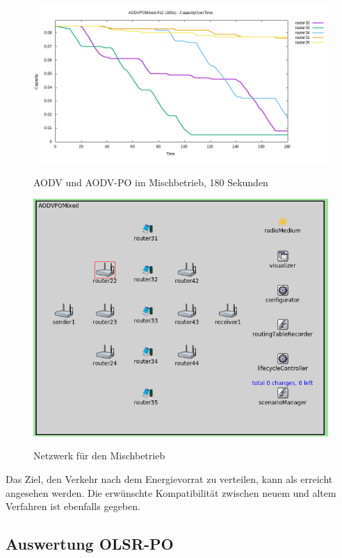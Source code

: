 \begin{figure}
  \centering
  \includegraphics[scale=0.55]{bilder/av11.png} \\
  \caption{AODV und AODV-PO im Mischbetrieb, 180 Sekunden}
  \label{image:omnet:olsr:av11}
\end{figure}

\begin{figure}
  \centering
  \includegraphics[scale=0.4]{bilder/netmixed.png} \\
  \caption{Netzwerk für den Mischbetrieb}
  \label{image:omnet:olsr:netmixed}
\end{figure}

Das Ziel, den Verkehr nach dem Energievorrat zu verteilen, kann als erreicht angesehen werden. Die erwünschte Kompatibilität zwischen neuem und altem Verfahren ist ebenfalls gegeben.

\subsection{Auswertung OLSR-PO}
\label{chapter:auswertung:versuche-olsr}

